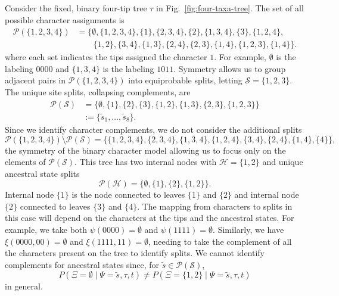 \documentclass{article}
\newcommand{\siteSplit}{\tilde{s}}
\newcommand{\siteSplitSet}{\mathcal{S}}
\newcommand{\ancestralSplitSet}{\mathcal{H}}
\newcommand{\patternToSplit}{\psi}
\newcommand{\ancestralToSplit}{\xi}
\newcommand{\siteSplitRV}{\Psi}
\newcommand{\ancestralSplitRV}{\Xi}
\begin{document}
Consider the fixed, binary four-tip tree $\tau$ in Fig.~\ref{fig:four-taxa-tree}.
The set of all possible character assignments is
\begin{align*}
\mathcal{P}(\{1,2,3,4\}) &= \{\emptyset, \{1,2,3,4\}, \{1\}, \{2,3,4\}, \{2\}, \{1,3,4\}, \{3\}, \{1,2,4\}, \\
                         &\qquad \{1,2\}, \{3,4\}, \{1,3\}, \{2,4\}, \{2,3\}, \{1,4\}, \{1,2,3\}, \{1,4\}\}.
\end{align*}
where each set indicates the tips assigned the character $1$.
For example, $\emptyset$ is the labeling $0000$ and $\{1,3,4\}$ is the labeling $1011$.
Symmetry allows us to group adjacent pairs in $\mathcal{P}(\{1,2,3,4\})$ into equiprobable splits, letting $\siteSplitSet=\{1,2,3\}$.
The unique site splits, collapsing complements, are
\begin{align*}
    \mathcal{P}(\siteSplitSet) &= \{\emptyset, \{1\}, \{2\}, \{3\}, \{1,2\}, \{1,3\}, \{2,3\}, \{1,2,3\}\} \\
& := \{\siteSplit_1, \ldots, \siteSplit_8\}.
\end{align*}
Since we identify character complements, we do not consider the additional splits
$$
\mathcal{P}(\{1,2,3,4\}) \setminus \mathcal{P}(\siteSplitSet) = \{\{1,2,3,4\}, \{2,3,4\}, \{1,3,4\}, \{1,2,4\}, \{3,4\}, \{2,4\}, \{1,4\}, \{4\}\},
$$
the symmetry of the binary character model allowing us to focus only on the elements of $\mathcal{P}(\siteSplitSet)$.
This tree has two internal nodes with $\ancestralSplitSet=\{1,2\}$ and unique ancestral state splits
$$
\mathcal{P}(\ancestralSplitSet) = \{\emptyset, \{1\}, \{2\}, \{1,2\}\}.
$$
Internal node $\{1\}$ is the node connected to leaves $\{1\}$ and $\{2\}$ and internal node $\{2\}$ connected to leaves $\{3\}$ and $\{4\}$.
The mapping from characters to splits in this case will depend on the characters at the tips and the ancestral states.
For example, we take both $\patternToSplit(0000)=\emptyset$ and $\patternToSplit(1111)=\emptyset$.
Similarly, we have $\ancestralToSplit(0000, 00) = \emptyset$ and $\ancestralToSplit(1111, 11)=\emptyset$, needing to take the complement of all the characters present on the tree to identify splits.
We cannot identify complements for ancestral states since, for $\siteSplit\in\mathcal{P}(\siteSplitSet)$,
$$
P(\ancestralSplitRV=\emptyset \mid \siteSplitRV=\siteSplit, \tau, t)\neq P(\ancestralSplitRV=\{1,2\} \mid \siteSplitRV=\siteSplit, \tau, t)
$$
in general.
\end{document}
